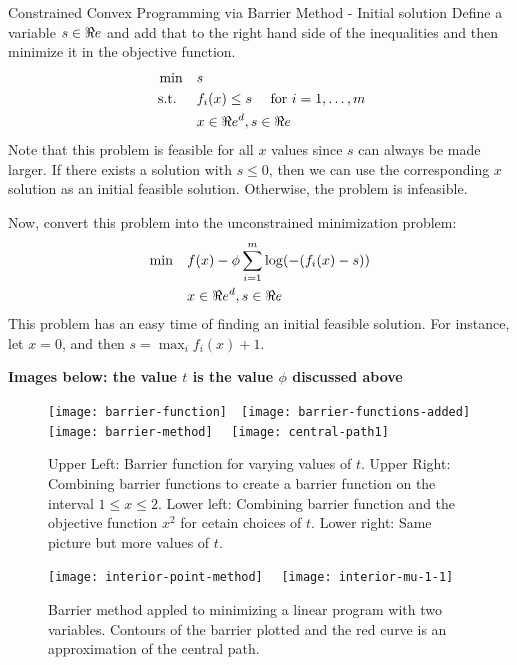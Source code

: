 \begin{general}{Constrained Convex Programming via Barrier Method - Initial solution}{}
Define a variable $s \in \Re e$ and add that to the right hand side of the inequalities and then minimize it in the objective function.
\begin{equation}
\label{eq:convex-programming}
\begin{split}
\min \quad & s\\
\mbox{ s.t. }  \quad & f_i(x) \leq s \quad  \mbox{ for } i=1, \dots, m\\
& x \in \Re e^d, s \in \Re e
\end{split}
\end{equation}
Note that this problem is feasible for all $x$ values since $s$ can always be made larger.  
If there exists a solution with $s \leq 0$, then we can use the corresponding $x$ solution as an initial feasible solution.  Otherwise, the problem is infeasible.

Now, convert this problem into the unconstrained minimization problem:
\begin{equation}
\label{eq:convex-programming}
\begin{split}
\min \quad & f(x) - \phi \sum_{i=1}^m \log(-(f_i(x)-s)) \\
& x \in \Re e^d, s \in \Re e
\end{split}
\end{equation}
This problem has an easy time of finding an initial feasible solution.  For instance, let $x = 0$, and then $s = \max_i f_i(x) +1 $.  
\end{general}


\textbf{Images below: the value $t$ is the value $\phi$ discussed above}
\begin{figure}
\texttt{[image: barrier-function]}\ \ 
\texttt{[image: barrier-functions-added]}\\
\texttt{[image: barrier-method]} \ \ 
\texttt{[image: central-path1]}
\caption{Upper Left: Barrier function for varying values of $t$.  Upper Right: Combining barrier functions to create a barrier function on the interval $1 \leq x \leq 2$. Lower left: Combining barrier function and the objective function $x^2$ for cetain choices of $t$.  Lower right: Same picture but more values of $t$.}
\end{figure}



\begin{figure}
\texttt{[image: interior-point-method]} \ \ 
\texttt{[image: interior-mu-1-1]}

\caption{Barrier method appled to minimizing a linear program with two variables.  Contours of the barrier plotted and the red curve is an approximation of the central path.}
\end{figure}


